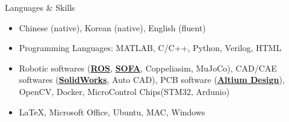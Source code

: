\begin{rSection}{Languages \& Skills}
  \begin{itemize}
  \item Chinese (native), Korean (native), English (fluent)
  \item Programming Languages: MATLAB, C/C++, Python, Verilog, HTML
  \item Robotic softwares (\textbf{\uline{ROS}}, \textbf{\uline{SOFA}}, Coppeliasim, MuJoCo), CAD/CAE softwares (\textbf{\uline{SolidWorks}}, Auto CAD), PCB software (\textbf{\uline{Altium Design}}), OpenCV, Docker, MicroControl Chips(STM32, Ardunio)
  \item \LaTeX, Microsoft Office, Ubuntu, MAC, Windows
  \end{itemize}
\end{rSection}
